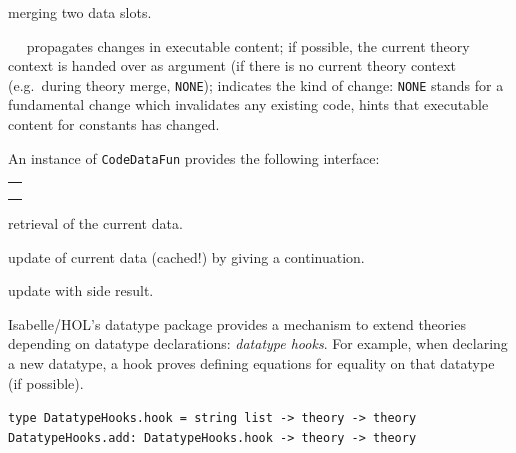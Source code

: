 \begin{isabellebody}
\begin{isamarkuptext}
\begin{description}
  \item {} merging two data slots.

  \item {}~~ propagates changes in executable content;
    if possible, the current theory context is handed over
    as argument  (if there is no current theory context (e.g.~during
    theory merge, \verb|NONE|);  indicates the kind
    of change: \verb|NONE| stands for a fundamental change
    which invalidates any existing code, 
    hints that executable content for constants 
    has changed.

  \end{description}

  An instance of \verb|CodeDataFun| provides the following
  interface:

  \medskip
  \begin{tabular}{l}
  \isa{get{\isacharcolon}\ theory\ {\isasymrightarrow}\ T} \\
  \isa{change{\isacharcolon}\ theory\ {\isasymrightarrow}\ {\isacharparenleft}T\ {\isasymrightarrow}\ T{\isacharparenright}\ {\isasymrightarrow}\ T} \\
  \isa{change{\isacharunderscore}yield{\isacharcolon}\ theory\ {\isasymrightarrow}\ {\isacharparenleft}T\ {\isasymrightarrow}\ {\isacharprime}a\ {\isacharasterisk}\ T{\isacharparenright}\ {\isasymrightarrow}\ {\isacharprime}a\ {\isacharasterisk}\ T}
  \end{tabular}

  \begin{description}

  \item {} retrieval of the current data.

  \item {} update of current data (cached!)
    by giving a continuation.

  \item {} update with side result.

  \end{description}%
\end{isamarkuptext}%
\isamarkuptrue%
%
\isamarkuptrue%
%
\begin{isamarkuptext}%
Isabelle/HOL's datatype package provides a mechanism to
  extend theories depending on datatype declarations:
  \emph{datatype hooks}.  For example, when declaring a new
  datatype, a hook proves defining equations for equality on
  that datatype (if possible).%
\end{isamarkuptext}%
\isamarkuptrue%
%
\isadelimmlref
%
\endisadelimmlref
%
\isatagmlref
%
\begin{isamarkuptext}%
\begin{mldecls}
  \verb|type DatatypeHooks.hook = string list -> theory -> theory| \\
  \verb|DatatypeHooks.add: DatatypeHooks.hook -> theory -> theory|
  \end{mldecls}


\end{isamarkuptext}
\end{isabellebody}
